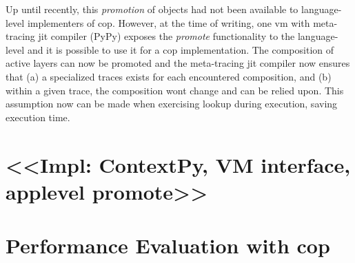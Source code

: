 \documentclass[preprint,english,10pt,nonatbib]{sigplanconf}
\begin{document}
Up until recently, this \emph{promotion} of objects had not been available to
language-level implementers of \ac{cop}. However, at the time of writing, one
\ac{vm} with meta-tracing \ac{jit} compiler (PyPy) exposes the \emph{promote}
functionality to the language-level and it is possible to use it for a \ac{cop}
implementation. The composition of active layers can now be promoted and the
meta-tracing \ac{jit} compiler now ensures that (a) a specialized traces exists
for each encountered composition, and (b) within a given trace, the composition
wont change and can be relied upon. This assumption now can be made when
exercising lookup during execution, saving execution time.


\section{<<Impl: ContextPy, VM interface, applevel promote>>}


%
\section{Performance Evaluation with \acs{cop}}
\end{document}
